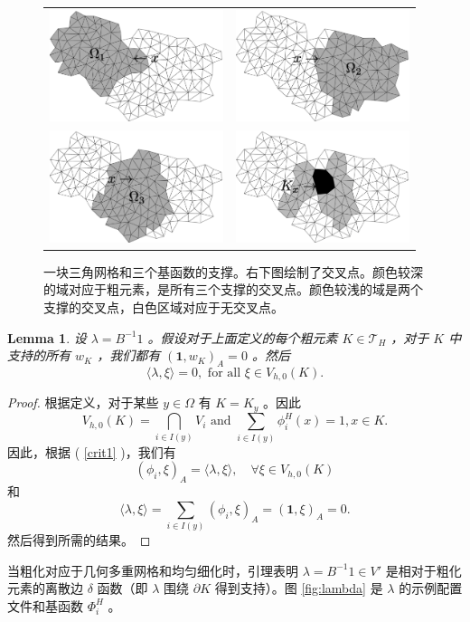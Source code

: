 \documentclass[12pt]{acta_2011xz}
\newtheorem{lemma}[theorem]{Lemma}
\begin{document}
   \begin{figure}[!htb]
\begin{tabular}{cc}
\includegraphics*[width=2in]{figures/f1ga}
& \includegraphics*[width=2in]{figures/f2ga} \\ 
\includegraphics*[width=2in]{figures/f3ga} &
\includegraphics*[width=2in]{figures/capfga}
\end{tabular}
\caption{   \label{fig:supports}    一块三角网格和三个基函数的支撑。右下图绘制了交叉点。颜色较深的域对应于粗元素，是所有三个支撑的交叉点。颜色较浅的域是两个支撑的交叉点，白色区域对应于无交叉点。  }
\end{figure}     

   \begin{lemma}设    $\lambda=B^{-1}1$    。假设对于上面定义的每个粗元素    $K\in {\mathcal
T}_H$    ，对于    $K$    中支持的所有    $w_K$    ，我们都有    $(\bm 1,w_K)_A = 0$    。然后
   $$
\langle\lambda,\xi\rangle=0,\mbox{ for all } \xi\in V_{h,0}(K).
$$     \end{lemma}    
   \begin{proof}根据定义，对于某些    $y\in \Omega$    有    $K=K_y$    。因此
   $$ 
V_{h,0}(K)=\bigcap_{i\in I(y)} V_i
\mbox{ and } \sum_{i\in I(y)}\phi_i^H(x)=1,
x\in K.
$$    因此，根据 (    \ref{crit1}    )，我们有 
   $$
(\phi_i,\xi)_A = \langle\lambda, \xi\rangle, 
\quad\forall \xi\in V_{h,0}(K)
$$    和 
   $$
\langle\lambda, \xi\rangle= 
\sum_{i\in I(y)} (\phi_i,\xi)_A =(\bm{1},\xi)_A=0.
$$    然后得到所需的结果。  \end{proof}    当粗化对应于几何多重网格和均匀细化时，引理表明    $\lambda=B^{-1}1\in V'$    是相对于粗化元素的离散边
   $\delta$    函数（即
   $\lambda$    围绕    $\partial K$    得到支持）。图    \ref{fig:lambda}    是    $\lambda$    的示例配置文件和基函数    $\Phi_i^H$    。  
\end{document}
